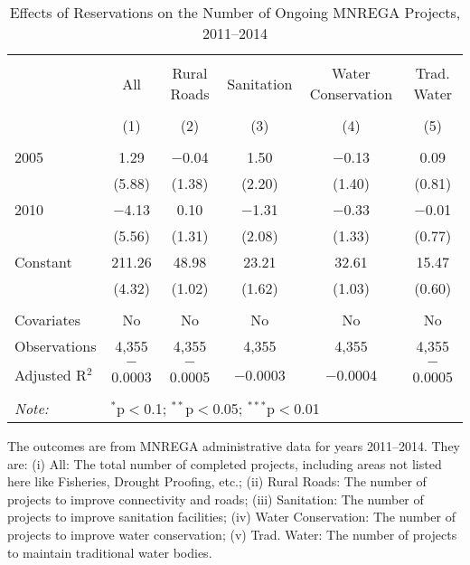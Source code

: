 \begin{table}[!htbp]
\centering
\begin{threeparttable}

  \caption{Effects of Reservations on the Number of Ongoing MNREGA Projects, 2011--2014} 
  \label{main_mnrega_ongoing} 
\scriptsize 
\begin{tabular}{@{\extracolsep{0pt}}lccccc} 
\\[-1.8ex]\hline 
\hline \\[-1.8ex] 
 & All & Rural Roads & Sanitation & Water Conservation & Trad. Water \\ 
\\[-1.8ex] & (1) & (2) & (3) & (4) & (5)\\ 
\hline \\[-1.8ex] 
 2005 & 1.29 & $-$0.04 & 1.50 & $-$0.13 & 0.09 \\ 
  & (5.88) & (1.38) & (2.20) & (1.40) & (0.81) \\ 
  2010 & $-$4.13 & 0.10 & $-$1.31 & $-$0.33 & $-$0.01 \\ 
  & (5.56) & (1.31) & (2.08) & (1.33) & (0.77) \\ 
  Constant & 211.26 & 48.98 & 23.21 & 32.61 & 15.47 \\ 
  & (4.32) & (1.02) & (1.62) & (1.03) & (0.60) \\ 
 \hline \\[-1.8ex] 
Covariates & No & No & No & No & No \\ 
Observations & 4,355 & 4,355 & 4,355 & 4,355 & 4,355 \\ 
Adjusted R$^{2}$ & $-$0.0003 & $-$0.0005 & $-$0.0003 & $-$0.0004 & $-$0.0005 \\ 
\hline 
\hline \\[-1.8ex] 
\textit{Note:}  & \multicolumn{5}{l}{$^{*}$p$<$0.1; $^{**}$p$<$0.05; $^{***}$p$<$0.01} \\ 
\end{tabular} 
\begin{tablenotes}[flushleft]
\scriptsize
\item The outcomes are from MNREGA administrative data for years 2011--2014. They are: 
(i) All: The total number of completed projects, including areas not listed here like Fisheries, Drought Proofing, etc.;
(ii) Rural Roads: The number of projects to improve connectivity and roads;
(iii) Sanitation: The number of projects to improve sanitation facilities;
(iv) Water Conservation: The number of projects to improve water conservation;
(v) Trad. Water: The number of projects to maintain traditional water bodies.
\end{tablenotes}
\end{threeparttable}
\end{table}
